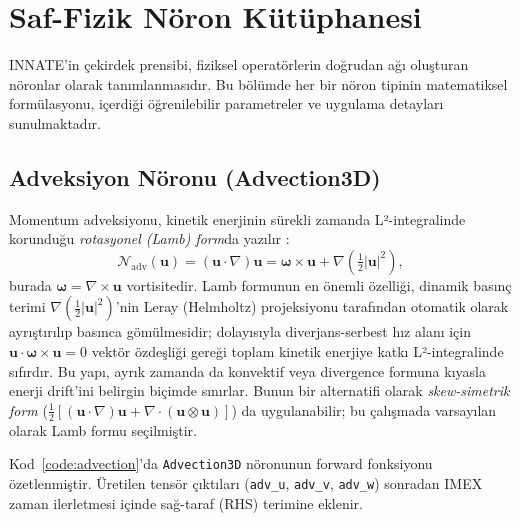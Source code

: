 \section{Saf-Fizik Nöron Kütüphanesi}

INNATE'in çekirdek prensibi, fiziksel operatörlerin doğrudan ağı oluşturan nöronlar olarak tanımlanmasıdır. Bu bölümde her bir nöron tipinin matematiksel formülasyonu, içerdiği öğrenilebilir parametreler ve uygulama detayları sunulmaktadır.

\subsection{Adveksiyon Nöronu (Advection3D)}

Momentum adveksiyonu, kinetik enerjinin sürekli zamanda L²-integralinde korunduğu \emph{rotasyonel (Lamb) form}da yazılır \cite{morinishi_skew_1998}:
\begin{equation}
\mathcal{N}_{\mathrm{adv}}(\mathbf{u}) = (\mathbf{u}\cdot\nabla)\mathbf{u}
= \boldsymbol{\omega}\times\mathbf{u} + \nabla\!\left(\tfrac{1}{2}|\mathbf{u}|^{2}\right),
\label{eq:advection_lamb}
\end{equation}
burada $\boldsymbol{\omega}=\nabla\times\mathbf{u}$ vortisitedir. Lamb formunun en önemli özelliği, dinamik basınç terimi $\nabla(\tfrac{1}{2}|\mathbf{u}|^{2})$'nin Leray (Helmholtz) projeksiyonu tarafından otomatik olarak ayrıştırılıp basınca gömülmesidir; dolayısıyla diverjans-serbest hız alanı için $\mathbf{u}\cdot\boldsymbol{\omega}\times\mathbf{u}=0$ vektör özdeşliği gereği toplam kinetik enerjiye katkı L²-integralinde sıfırdır. Bu yapı, ayrık zamanda da konvektif veya divergence formuna kıyasla enerji drift'ini belirgin biçimde sınırlar. Bunun bir alternatifi olarak \emph{skew-simetrik form} ($\tfrac{1}{2}[(\mathbf{u}\cdot\nabla)\mathbf{u}+\nabla\cdot(\mathbf{u}\otimes\mathbf{u})]$) da uygulanabilir; bu çalışmada varsayılan olarak Lamb formu seçilmiştir.

Kod~\ref{code:advection}'da \texttt{Advection3D} nöronunun forward fonksiyonu özetlenmiştir. Üretilen tensör çıktıları (\texttt{adv\_u}, \texttt{adv\_v}, \texttt{adv\_w}) sonradan IMEX zaman ilerletmesi içinde sağ-taraf (RHS) terimine eklenir.

